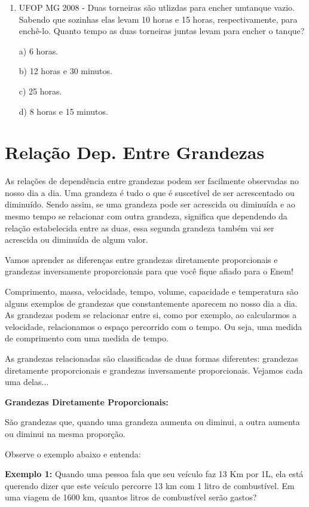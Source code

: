 \begin{multicols*}{2}
\begin{enumerate}
		\item UFOP MG 2008 - Duas torneiras são utlizdas para encher umtanque vazio. Sabendo que sozinhas elas levam 10 horas e 15 horas, respectivamente, para enchê-lo. Quanto tempo as duas torneiras juntas levam para encher o tanque?

		      a)	6 horas.

		      b) 12 horas e 30 minutos.

		      c) 25 horas.

		      d) 8 horas e 15 minutos.\\

	\end{enumerate}

	\section{Relação Dep. Entre Grandezas}

	As relações de dependência entre grandezas podem ser facilmente observadas no nosso dia a dia. Uma grandeza é tudo o que é suscetível de ser acrescentado ou diminuído. Sendo assim, se uma grandeza pode ser acrescida ou diminuída e ao mesmo tempo se relacionar com outra grandeza, significa que dependendo da relação estabelecida entre as duas, essa segunda grandeza também vai ser acrescida ou diminuída de algum valor.

	Vamos aprender as diferenças entre grandezas diretamente proporcionais e grandezas inversamente proporcionais para que você fique afiado para o Enem!

	Comprimento, massa, velocidade, tempo, volume, capacidade e temperatura são alguns exemplos de grandezas que constantemente aparecem no nosso dia a dia. As grandezas podem se relacionar entre si,  como por exemplo, ao calcularmos a velocidade, relacionamos o espaço percorrido com o tempo. Ou seja, uma medida de comprimento com uma medida de tempo.

	As grandezas relacionadas são classificadas de duas formas diferentes: grandezas diretamente proporcionais  e grandezas inversamente proporcionais. Vejamos cada uma delas...

	\textbf{Grandezas Diretamente Proporcionais:}

	São grandezas que, quando uma grandeza aumenta ou diminui, a outra aumenta ou diminui na mesma proporção.

	Observe o exemplo abaixo e entenda:

	\textbf{Exemplo 1:} Quando uma pessoa fala que seu veículo faz 13 Km por 1L, ela está querendo dizer que este veículo percorre 13 km com 1 litro de combustível. Em uma viagem de 1600 km, quantos litros de combustível serão gastos?


\end{multicols*}
